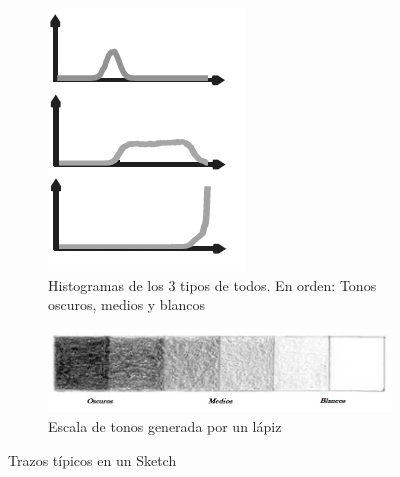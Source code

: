 \documentclass[letterpaper, 10 pt, conference]{ieeeconf}  %
\begin{document}
\begin{figure}
\begin{subfigure}{0.45\linewidth}
\includegraphics[width=\linewidth, scale=0.1]{images/tone_ex_hist.png}
    \caption{Histogramas de los 3 tipos de todos. En orden: Tonos oscuros, medios y blancos}
\label{dib-hist}
    \end{subfigure}\vfill
    \begin{subfigure}{0.45\linewidth}
\includegraphics[width=\linewidth, scale=0.1]{images/value.jpg}
    \caption{Escala de tonos generada por un lápiz}
\label{fig:1a}
    \end{subfigure}
\caption{Trazos típicos en un Sketch}
\label{uno}
    \end{figure}
\end{document}
